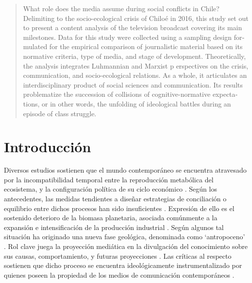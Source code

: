 \documentclass{textolivre}
\begin{document}
\begin{polyabstract}
\begin{english}
\begin{abstract}
What role does the media assume during social conflicts in Chile? Delimiting
to the socio-ecological crisis of Chiloé in 2016, this study set out to present a content
analysis of the television broadcast covering its main milestones. Data for this study were
collected using a sampling design formulated for the empirical comparison of journalistic
material based on its normative criteria, type of media, and stage of development.
Theoretically, the analysis integrates Luhmannian and Marxist p erspectives on the crisis,
communication, and socio-ecological relations. As a whole, it articulates an
interdisciplinary product of social sciences and communication. Its results problematize the
succession of collisions of cognitive-normative expectations, or in other words, the
unfolding of ideological battles during an episode of class struggle.

\end{abstract}
\end{english}

\end{polyabstract}


\section{Introducción}\label{sec-intro}
Diversos estudios sostienen que el mundo contemporáneo se encuentra
atravesado por la incompatibilidad temporal entre la reproducción metabólica del
ecosistema, y la configuración política de su ciclo económico \cite{arboleda,Mascareo2018}.
Según los antecedentes, las medidas tendientes a diseñar
estrategias de conciliación o equilibrio entre dichos procesos han sido insuficientes
\cite{Folke2016}. Expresión de ello es el sostenido deterioro de la biomasa planetaria,
asociada comúnmente a la expansión e intensificación de la producción industrial \cite{ipcc2013,Kamjunke2017}. 
Según algunos tal situación ha originado una nueva fase
geológica, denominada como ‘antropoceno’ \cite{Foster2016}. Rol clave juega la
proyección mediática en la divulgación del conocimiento sobre sus causas,
comportamiento, y futuras proyecciones \cite{billi2017}. Las críticas al
respecto sostienen que dicho proceso se encuentra ideológicamente instrumentalizado
por quienes poseen la propiedad de los medios de comunicación contemporáneos
\cite{Gunderson2019}.
\end{document}
